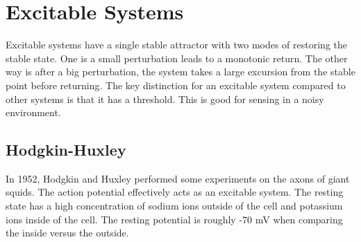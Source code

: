 \documentclass{article}
\begin{document}
\section{Excitable Systems}
Excitable systems have a single stable attractor with two modes of restoring the stable state. One is a small perturbation leads to a monotonic return. The other way is after a big perturbation, the system takes a large excursion from the stable point before returning. The key distinction for an excitable system compared to other systems is that it has a threshold. This is good for sensing in a noisy environment. 
\subsection{Hodgkin-Huxley}
In 1952, Hodgkin and Huxley performed some experiments on the axons of giant squids. The action potential effectively acts as an excitable system. The resting state has a high concentration of sodium ions outside of the cell and potassium ions inside of the cell. The resting potential is roughly -70 mV when comparing the inside versus the outside.
\end{document}
